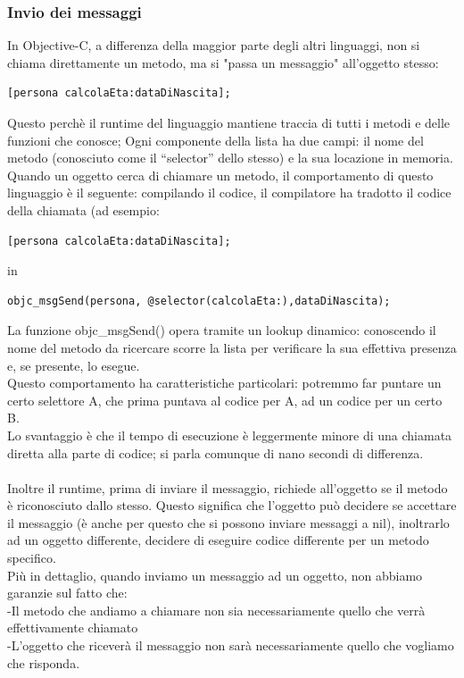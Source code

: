 \subsubsection{Invio dei messaggi}
In Objective-C, a differenza della maggior parte degli altri linguaggi, non si chiama direttamente un metodo, ma si "passa un messaggio" all'oggetto stesso: 
\lstset{language=[Objective]C, breakindent=40pt, breaklines}
\begin{lstlisting}
[persona calcolaEta:dataDiNascita];
\end{lstlisting}
Questo perchè il runtime del linguaggio mantiene traccia di tutti i metodi e delle funzioni che conosce; Ogni componente della lista ha due campi: il nome del metodo (conosciuto come il “selector” dello stesso) e la sua locazione in memoria.\\Quando un oggetto cerca di chiamare un metodo, il comportamento di questo linguaggio è il seguente: compilando il codice, il compilatore ha tradotto il codice della chiamata (ad esempio: 
\lstset{language=[Objective]C, breakindent=40pt, breaklines}
\begin{lstlisting}
[persona calcolaEta:dataDiNascita];
\end{lstlisting}
in \lstset{language=[Objective]C, breakindent=40pt, breaklines}
\begin{lstlisting}
objc_msgSend(persona, @selector(calcolaEta:),dataDiNascita);
\end{lstlisting}
\bigskip
\bigskip
La funzione objc\_msgSend() opera tramite un lookup dinamico: conoscendo il nome del metodo da ricercare scorre la lista per verificare la sua effettiva presenza e, se presente, lo esegue.\\ 
Questo comportamento ha caratteristiche particolari: potremmo far puntare un certo selettore A, che prima puntava al codice per A, ad un codice per un certo B.\\ 
Lo svantaggio è che il tempo di esecuzione è leggermente minore di una chiamata diretta alla parte di codice; si parla comunque di nano secondi di differenza.\\
\\Inoltre il runtime, prima di inviare il messaggio, richiede all’oggetto se il metodo è riconosciuto dallo stesso. Questo significa che l’oggetto può decidere se accettare il messaggio (è anche per questo che si possono inviare messaggi a nil), inoltrarlo ad un oggetto differente, decidere di eseguire codice differente per un metodo specifico.\\Più in dettaglio, quando inviamo un messaggio ad un oggetto, non abbiamo garanzie sul fatto che: \\-Il metodo che andiamo a chiamare non sia necessariamente quello che verrà effettivamente chiamato\\-L’oggetto che riceverà il messaggio non sarà necessariamente quello che vogliamo che risponda.
